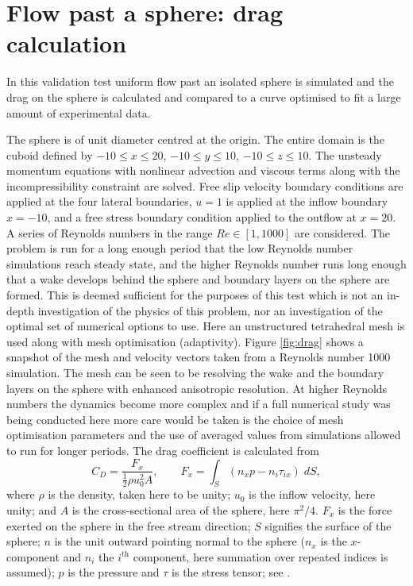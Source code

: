 

\section{Flow past a sphere: drag calculation}

In this validation test uniform flow past an isolated sphere is simulated
and the drag on the sphere is calculated and compared to a curve optimised
to fit a large amount of experimental data.

The sphere is of unit diameter centred at the origin. The entire domain is
the cuboid defined by $-10\le x\le 20$, $-10\le y\le 10$, $-10\le z\le 10$.
The unsteady momentum equations with nonlinear advection and viscous terms
along with the incompressibility constraint are solved. Free slip velocity
boundary conditions are applied at the four lateral boundaries, $u=1$ is
applied at the inflow boundary $x=-10$, and a free stress boundary condition
applied to the outflow at $x=20$. A series of Reynolds numbers in the range
$Re\in [1,1000]$ are considered. The problem is run for a long enough
period that the low Reynolds number simulations reach steady state, and the
higher Reynolds number runs long enough that a wake develops behind the
sphere and boundary layers on the sphere are formed.  This is deemed
sufficient for the purposes of this test which is not an in-depth
investigation of the physics of this problem, nor an investigation of the optimal
set of numerical options to use.  Here an unstructured
tetrahedral mesh is used along with mesh optimisation (adaptivity). 
Figure \ref{fig:drag} shows a snapshot of the
mesh and velocity vectors taken from a Reynolds number 1000 simulation. The
mesh can be seen to be resolving the wake and the boundary layers on the
sphere with enhanced anisotropic resolution. At higher Reynolds numbers the
dynamics become more complex and if a full numerical study was being
conducted here more care would be taken is the choice of mesh optimisation
parameters and the use of averaged values from simulations allowed to run
for longer periods. The drag coefficient is calculated from
\begin{equation}
C_D = \frac{F_x}{\frac{1}{2}\rho u_0^2 A},\qquad F_x = \int_S (n_xp - n_i\tau_{ix})\;dS,
\end{equation}
where $\rho$ is the density, taken here to be unity; 
$u_0$ is the inflow velocity, here unity; 
and $A$ is the cross-sectional area of the sphere, here $\pi^2/4$. 
$F_x$ is the force 
exerted on the sphere in the free stream direction;
$S$ signifies the surface of the sphere; $n$ is the 
unit outward pointing normal to the sphere 
($n_x$ is the $x$-component and $n_i$ the $i^{\textrm{th}}$ 
component, here summation over repeated indices is assumed); 
$p$ is the pressure and $\tau$ is the stress tensor;
see \citet{panton2006}.

